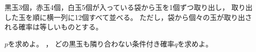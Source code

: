 \documentclass[../../main.tex]{subfiles}
\begin{document}
黒玉3個，赤玉4個，白玉5個が入っている袋から玉を1個ずつ取り出し，
取り出した玉を順に横一列に12個すべて並べる。
ただし，袋から個々の玉が取り出される確率は等しいものとする。
\begin{enumerate}
  $p$を求めよ。
  ，
    どの黒玉も隣り合わない条件付き確率$q$を求めよ。
\end{enumerate}
\end{document}
